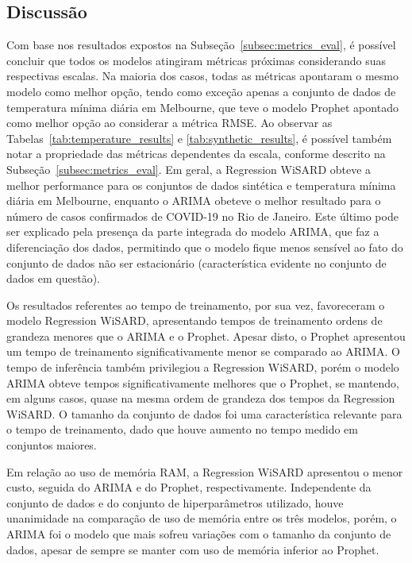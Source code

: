 \FloatBarrier

\subsection{Discussão}
Com base nos resultados expostos na Subseção~\ref{subsec:metrics_eval}, é possível concluir que todos os modelos atingiram métricas próximas considerando suas respectivas escalas. Na maioria dos casos, todas as métricas apontaram o mesmo modelo como melhor opção, tendo como exceção apenas a conjunto de dados de temperatura mínima diária em Melbourne, que teve o modelo Prophet apontado como melhor opção ao considerar a métrica RMSE. Ao observar as Tabelas~\ref{tab:temperature_results} e \ref{tab:synthetic_results}, é possível também notar a propriedade das métricas dependentes da escala, conforme descrito na Subseção~\ref{subsec:metrics_eval}. Em geral, a Regression WiSARD obteve a melhor performance para os conjuntos de dados sintética e temperatura mínima diária em Melbourne, enquanto o ARIMA obeteve o melhor resultado para o número de casos confirmados de COVID-19 no Rio de Janeiro. Este último pode ser explicado pela presença da parte integrada do modelo ARIMA, que faz a diferenciação dos dados, permitindo que o modelo fique menos sensível ao fato do conjunto de dados não ser estacionário (característica evidente no conjunto de dados em questão).

Os resultados referentes ao tempo de treinamento, por sua vez, favoreceram o modelo Regression WiSARD, apresentando tempos de treinamento ordens de grandeza menores que o ARIMA e o Prophet. Apesar disto, o Prophet apresentou um tempo de treinamento significativamente menor se comparado ao ARIMA. O tempo de inferência também privilegiou a Regression WiSARD, porém o modelo ARIMA obteve tempos significativamente melhores que o Prophet, se mantendo, em alguns casos, quase na mesma ordem de grandeza dos tempos da Regression WiSARD. O tamanho da conjunto de dados foi uma característica relevante para o tempo de treinamento, dado que houve aumento no tempo medido em conjuntos maiores.

Em relação ao uso de memória RAM, a Regression WiSARD apresentou o menor custo, seguida do ARIMA e do Prophet, respectivamente. Independente da conjunto de dados e do conjunto de hiperparâmetros utilizado, houve unanimidade na comparação de uso de memória entre os três modelos, porém, o ARIMA foi o modelo que mais sofreu variações com o tamanho da conjunto de dados, apesar de sempre se manter com uso de memória inferior ao Prophet.